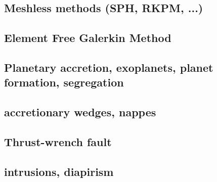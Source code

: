 \cite{trry95}
\cite{zhzl07}
\cite{zhzm09}
\cite{begb19}


\subsection*{Meshless methods (SPH, RKPM, ...)}

\cite{beko96}
\cite{febh05}
\cite{nifs15}

\subsection*{Element Free Galerkin Method}

\cite{belg95a}
\cite{belg95b}
\cite{bekf96}
\cite{bekk97}




\subsection*{Planetary accretion, exoplanets, planet formation, segregation}

\cite{lejm08}
\cite{ligt09}\cite{gogk09}
\cite{ligt11}
\cite{gobg14}\cite{yadl14}
\cite{neum19}

\subsection*{accretionary wedges, nappes} 

\cite{wiep03}
\cite{rugb14}
\cite{mauw16}
\cite{mauw17}\cite{rugb17}
\cite{elgb19}

\subsection*{Thrust-wrench fault} 

\cite{rods15}

\subsection*{intrusions, diapirism}

